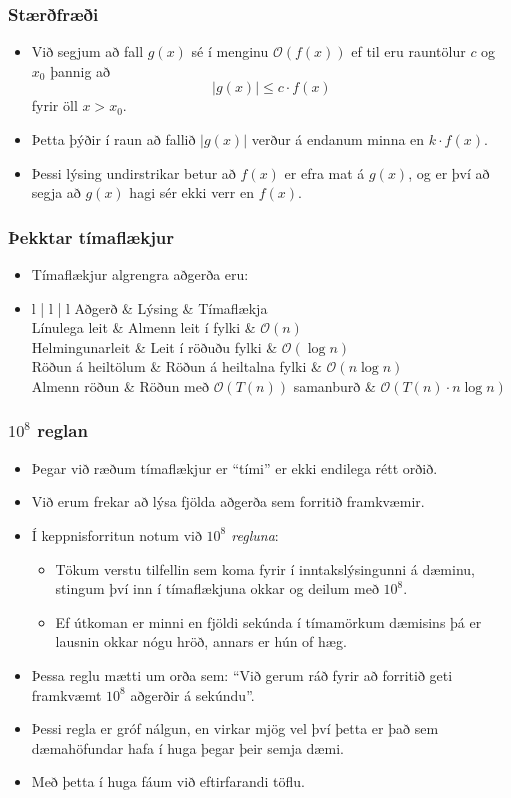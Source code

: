 \documentclass{beamer}
\newcommand\env[2]
{
	\begin{#1}
	#2
	\end{#1}
}
\begin{document}
\env{frame}
{
	\frametitle{Stærðfræði}
	\env{itemize}
	{
		\item<1-> Við segjum að fall $g(x)$ sé í menginu $\mathcal{O}(f(x))$ ef til eru rauntölur $c$ og $x_0$ þannig að
		\[
			|g(x)| \leq c \cdot f(x)
		\]
		fyrir öll $x > x_0$.
		\item<2-> Þetta þýðir í raun að fallið $|g(x)|$ verður á endanum minna en $k \cdot f(x)$.
		\item<3-> Þessi lýsing undirstrikar betur að $f(x)$ er efra mat á $g(x)$, og er því að segja að $g(x)$ hagi sér ekki verr en $f(x)$.
	}
}

\env{frame}
{
	\frametitle{Þekktar tímaflækjur}
	\env{itemize}
	{
		\item<1-> Tímaflækjur algrengra aðgerða eru:
		\item<2->
		\tiny
		\env{tabular}
		{
			{l | l | l}
			Aðgerð & Lýsing & Tímaflækja\\
			\hline
			Línulega leit & Almenn leit í fylki & $\mathcal{O}(n)$\\
			Helmingunarleit & Leit í röðuðu fylki & $\mathcal{O}(\log n)$\\
			Röðun á heiltölum & Röðun á heiltalna fylki & $\mathcal{O}(n \log n)$\\
			Almenn röðun & Röðun með $\mathcal{O}(T(n))$ samanburð & $\mathcal{O}(T(n) \cdot n \log n)$\\
		}
	}
}

\env{frame}
{
	\frametitle{$10^8$ reglan}
	\env{itemize}
	{
		\item<1-> Þegar við ræðum tímaflækjur er ``tími'' er ekki endilega rétt orðið.
		\item<2-> Við erum frekar að lýsa fjölda aðgerða sem forritið framkvæmir.
		\item<3-> Í keppnisforritun notum við \emph{$10^8$ regluna}:
		\env{itemize}
		{
			\item<4-> Tökum verstu tilfellin sem koma fyrir í inntakslýsingunni á dæminu,
						stingum því inn í tímaflækjuna okkar
						og deilum með $10^8$.
			\item<5-> Ef útkoman er minni en fjöldi sekúnda í tímamörkum dæmisins þá er lausnin okkar nógu hröð, annars er hún of hæg.
		}
		\item<6-> Þessa reglu mætti um orða sem: ``Við gerum ráð fyrir að forritið geti framkvæmt $10^8$ aðgerðir á sekúndu''.
		\item<7-> Þessi regla er gróf nálgun, en virkar mjög vel því þetta er það sem dæmahöfundar hafa í huga þegar þeir semja dæmi.
		\item<8-> Með þetta í huga fáum við eftirfarandi töflu.
	}
}
\end{document}
